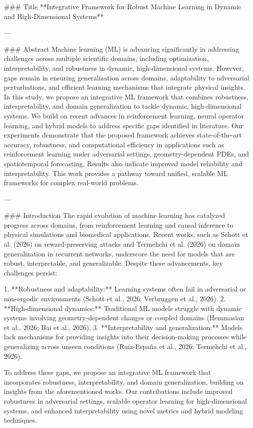 ### Title  
**Integrative Framework for Robust Machine Learning in Dynamic and High-Dimensional Systems**  

---

### Abstract  
Machine learning (ML) is advancing significantly in addressing challenges across multiple scientific domains, including optimization, interpretability, and robustness in dynamic, high-dimensional systems. However, gaps remain in ensuring generalization across domains, adaptability to adversarial perturbations, and efficient learning mechanisms that integrate physical insights. In this study, we propose an integrative ML framework that combines robustness, interpretability, and domain generalization to tackle dynamic, high-dimensional systems. We build on recent advances in reinforcement learning, neural operator learning, and hybrid models to address specific gaps identified in literature. Our experiments demonstrate that the proposed framework achieves state-of-the-art accuracy, robustness, and computational efficiency in applications such as reinforcement learning under adversarial settings, geometry-dependent PDEs, and spatiotemporal forecasting. Results also indicate improved model reliability and interpretability. This work provides a pathway toward unified, scalable ML frameworks for complex real-world problems.  

---

### Introduction  
The rapid evolution of machine learning has catalyzed progress across domains, from reinforcement learning and causal inference to physical simulations and biomedical applications. Recent works, such as Schott et al. (2026) on reward-preserving attacks and Termehchi et al. (2026) on domain generalization in recurrent networks, underscore the need for models that are robust, interpretable, and generalizable. Despite these advancements, key challenges persist:  

1. **Robustness and adaptability:** Learning systems often fail in adversarial or non-ergodic environments (Schott et al., 2026; Verbruggen et al., 2026).  
2. **High-dimensional dynamics:** Traditional ML models struggle with dynamic systems involving geometry-dependent changes or coupled domains (Hemmasian et al., 2026; Bai et al., 2026).  
3. **Interpretability and generalization:** Models lack mechanisms for providing insights into their decision-making processes while generalizing across unseen conditions (Ruiz-España et al., 2026; Termehchi et al., 2026).  

To address these gaps, we propose an integrative ML framework that incorporates robustness, interpretability, and domain generalization, building on insights from the aforementioned works. Our contributions include improved robustness in adversarial settings, scalable operator learning for high-dimensional systems, and enhanced interpretability using novel metrics and hybrid modeling techniques.  

